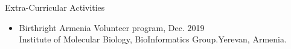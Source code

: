 \documentclass{resume}
\begin{document}


\begin{rSection}{Extra-Curricular Activities} 
\begin{itemize}
   \item 	Birthright Armenia Volunteer program, \hfill Dec. 2019\\
   Institute of Molecular Biology, BioInformatics Group.\hfill Yerevan, Armenia.
   \end{itemize}
\end{rSection}
\end{document}
